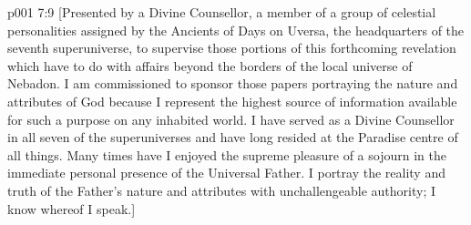 \vsetoff
\vs p001 7:9 [Presented by a Divine Counsellor, a member of a group of celestial personalities assigned by the Ancients of Days on Uversa, the headquarters of the seventh superuniverse, to supervise those portions of this forthcoming revelation which have to do with affairs beyond the borders of the local universe of Nebadon. I am commissioned to sponsor those papers portraying the nature and attributes of God because I represent the highest source of information available for such a purpose on any inhabited world. I have served as a Divine Counsellor in all seven of the superuniverses and have long resided at the Paradise centre of all things. Many times have I enjoyed the supreme pleasure of a sojourn in the immediate personal presence of the Universal Father. I portray the reality and truth of the Father’s nature and attributes with unchallengeable authority; I know whereof I speak.]
\quizlink
{}
